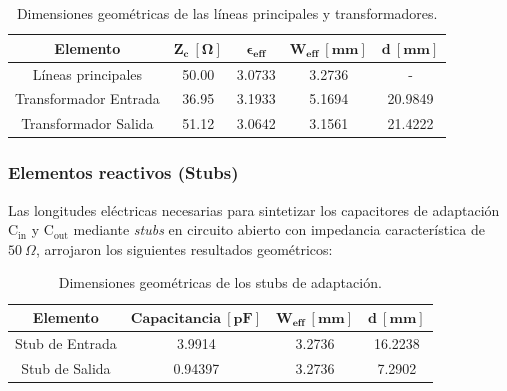\documentclass{article}
\begin{document}
\begin{table}[!h]
    \centering
    \renewcommand{\arraystretch}{1.2}
    \begin{tabular}{|c|c|c|c|c|} \hline
        \textbf{Elemento} & $\mathbf{Z_c \ [\Omega]}$ & $\mathbf{\epsilon_{eff}}$ & $\mathbf{W_{eff} \ [mm]}$ & $\mathbf{d \ [mm]}$ \\ \hline
        Líneas principales & 50.00 & 3.0733 & 3.2736 & - \\ \hline
        Transformador Entrada & 36.95 & 3.1933 & 5.1694 & 20.9849 \\ \hline
        Transformador Salida & 51.12 & 3.0642 & 3.1561 & 21.4222 \\ \hline
    \end{tabular}
    \caption{Dimensiones geométricas de las líneas principales y transformadores.}
    \label{tab:dims_lineas}
\end{table}



\subsubsection{Elementos reactivos (Stubs)} \label{section:sec_3.6.2}
Las longitudes eléctricas necesarias para sintetizar los capacitores de adaptación $\mathrm{C_{in}}$ y $\mathrm{C_{out}}$ mediante \textit{stubs} en circuito abierto con impedancia característica de $50 \ \Omega$, arrojaron los siguientes resultados geométricos:
\begin{table}[!h]
    \centering
    \renewcommand{\arraystretch}{1.2}
    \begin{tabular}{|c|c|c|c|} \hline
        \textbf{Elemento} & $\mathbf{Capacitancia \ [pF]}$ & $\mathbf{W_{eff} \ [mm]}$ & $\mathbf{d \ [mm]}$ \\ \hline
        Stub de Entrada & 3.9914 & 3.2736 & 16.2238 \\ \hline
        Stub de Salida & 0.94397 & 3.2736 & 7.2902 \\ \hline
    \end{tabular}
    \caption{Dimensiones geométricas de los stubs de adaptación.}
    \label{tab:dims_stubs}
\end{table}
\end{document}
